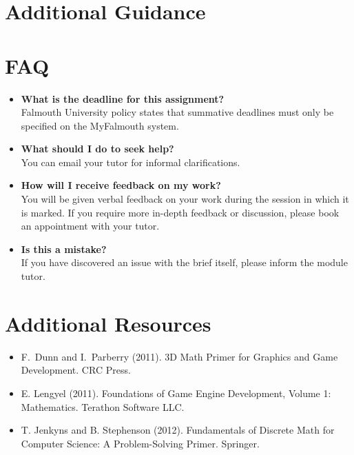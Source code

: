 \documentclass{../../fal_assignment}
\begin{document}
\section*{Additional Guidance}



\section*{FAQ}

\begin{itemize}
	\item 	\textbf{What is the deadline for this assignment?} \\ 
    		Falmouth University policy states that summative deadlines must only be specified on the MyFalmouth system.
    		
	\item 	\textbf{What should I do to seek help?} \\ 
    		You can email your tutor for informal clarifications.  
    		
	\item 	\textbf{How will I receive feedback on my work?} \\ 
    		You will be given verbal feedback on your work during the session in which it is marked.
    		If you require more in-depth feedback or discussion, please book an appointment with your tutor.
    		
    	\item 	\textbf{Is this a mistake?} \\ 	
    		If you have discovered an issue with the brief itself, please inform the module tutor.
    		
\end{itemize}

\section*{Additional Resources}

\begin{itemize}
    \item F.\ Dunn and I.\ Parberry (2011). 3D Math Primer for Graphics and Game Development. CRC Press.
    \item E. Lengyel (2011). Foundations of Game Engine Development, Volume 1: Mathematics. Terathon Software LLC.
    \item T. Jenkyns and B. Stephenson (2012). Fundamentals of Discrete Math for Computer Science: A Problem-Solving Primer. Springer.
\end{itemize}
\end{document}
